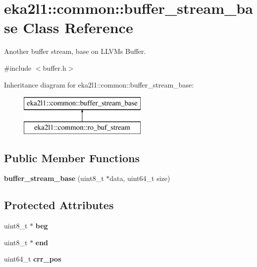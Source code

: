 \hypertarget{classeka2l1_1_1common_1_1buffer__stream__base}{}\section{eka2l1\+:\+:common\+:\+:buffer\+\_\+stream\+\_\+base Class Reference}
\label{classeka2l1_1_1common_1_1buffer__stream__base}


Another buffer stream, base on L\+L\+VM\textquotesingle{}s Buffer.  




{\ttfamily \#include $<$buffer.\+h$>$}

Inheritance diagram for eka2l1\+:\+:common\+:\+:buffer\+\_\+stream\+\_\+base\+:\begin{figure}[H]
\begin{center}
\leavevmode
\includegraphics[height=2.000000cm]{classeka2l1_1_1common_1_1buffer__stream__base}
\end{center}
\end{figure}
\subsection*{Public Member Functions}
\begin{DoxyCompactItemize}
\item 
\mbox{\label{classeka2l1_1_1common_1_1buffer__stream__base_a944ed5722f6cb4d83beed5a9414d17df}} 
{\bfseries buffer\+\_\+stream\+\_\+base} (uint8\+\_\+t $\ast$data, uint64\+\_\+t size)
\end{DoxyCompactItemize}
\subsection*{Protected Attributes}
\begin{DoxyCompactItemize}
\item 
\mbox{\label{classeka2l1_1_1common_1_1buffer__stream__base_af9274c7e015a5ff6ed6ced85eb8e38f3}} 
uint8\+\_\+t $\ast$ {\bfseries beg}
\item 
\mbox{\label{classeka2l1_1_1common_1_1buffer__stream__base_a8d13e15316a9b63ded3bd65b65bc70dc}} 
uint8\+\_\+t $\ast$ {\bfseries end}
\item 
\mbox{\label{classeka2l1_1_1common_1_1buffer__stream__base_a4d30c2c00539bb1a2acbf229d27b450e}} 
uint64\+\_\+t {\bfseries crr\+\_\+pos}
\end{DoxyCompactItemize}


